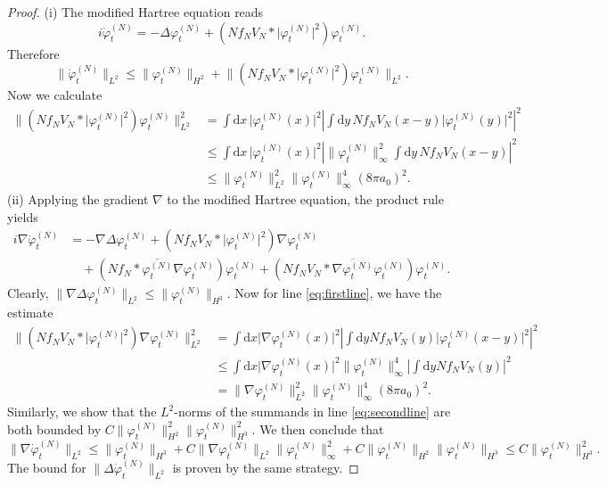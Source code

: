 \documentclass[11pt,a4paper]{scrartcl}
\newcommand{\di}{\textrm{d}}		%
\newcommand{\cc}[1]{\overline{#1}}	%
\newcommand{\norm}[1]{\lVert#1\rVert}	%
\newcommand{\ph}{\varphi_t^{(N)}}	%
\newcommand{\phdot}{\dot{\varphi}_t^{(N)}}	%
\newcommand{\bd}{\begin{displaymath}}			%
\newcommand{\ed}{\end{displaymath}}
\begin{document}
\begin{proof}(i) The modified Hartree equation reads
\bd
i \phdot = -\Delta \ph + \left(N f_N V_N \ast \lvert \ph \rvert^2 \right) \ph.
\ed
Therefore
\bd
\norm{\phdot}_{L^2} \leq \norm{\ph}_{H^2} + \norm{\left(N f_N V_N \ast \lvert \ph\rvert^2 \right)\ph}_{L^2}.
\ed
Now we calculate
\begin{align*}
\norm{\left(N f_N V_N \ast \lvert \ph\rvert^2 \right)\ph}_{L^2}^2 & = \int \di x\, \lvert \ph(x)\rvert^2 \left\lvert \int \di y\, N f_NV_N(x-y) \lvert \ph(y)\rvert^2 \right\rvert^2 \\
& \leq \int \di x\, \lvert \ph(x)\rvert^2 \left\lvert \norm{\ph}_\infty^2 \int \di y\, N f_N V_N(x-y) \right\rvert^2 \\
& \leq \norm{\ph}_{L^2}^2 \norm{\ph}_\infty^4 (8\pi a_0)^2.
\end{align*}
(ii)
Applying the gradient $\nabla$ to the modified Hartree equation, the product rule yields
\begin{align}
i \nabla \phdot & = - \nabla \Delta \ph + \left( N f_N V_N \ast \lvert \ph \rvert^2 \right) \nabla \ph \label{eq:firstline}\\
& \quad + \left( N f_N \ast \cc{\ph} \nabla \ph \right) \ph + \left( N f_N V_N \ast \cc{\nabla \ph} \ph \right) \ph. \label{eq:secondline}
\end{align}
Clearly, $\norm{\nabla \Delta \ph}_{L^2} \leq \norm{\ph}_{H^3}$. Now for line \eqref{eq:firstline}, we have the estimate
\begin{align*}
\norm{\left( N f_N V_N \ast \lvert \ph \rvert^2 \right)\nabla \ph}_{L^2}^2 & = \int \di x \lvert \nabla \ph(x)\rvert^2 \left\lvert \int \di y N f_N V_N(y) \lvert\ph(x-y) \rvert^2\right\rvert^2\\
& \leq \int \di x \lvert \nabla \ph(x)\rvert^2 \norm{\ph}_\infty^4 \left\lvert \int \di y N f_N V_N(y) \right\rvert^2 \\
& = \norm{\nabla \ph}_{L^2}^2 \norm{\ph}_\infty^4 (8 \pi a_0)^2. 
\end{align*}
Similarly, we show that the $L^2$-norms of the summands in line \eqref{eq:secondline} are both bounded by $C \norm{\ph}_{H^2}^2 \norm{\ph}_{H^3}^2$. We then conclude that
\bd
\norm{\nabla \phdot}_{L^2} \leq \norm{\ph}_{H^3} + C \norm{\nabla \ph}_{L^2} \norm{\ph}_\infty^2 + C \norm{\ph}_{H^2} \norm{\ph}_{H^3} \leq C \norm{\ph}_{H^3}^2.
\ed
The bound for $\norm{\Delta \phdot}_{L^2}$ is proven by the same strategy.


\end{proof}
\end{document}
